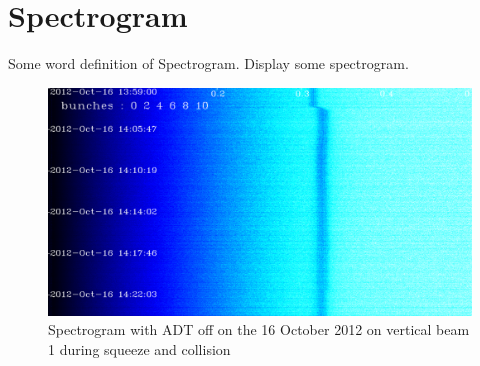 \section{Spectrogram}
\label{sec:spectrogram}

Some word definition of Spectrogram. Display some spectrogram.

\begin{figure}[H]
	\caption{Spectrogram with ADT off on the 16 October 2012 on vertical beam 1 during squeeze and collision}
	\centering
	\includegraphics[scale=0.3]{md-121016-vb1-m1-6bunches-10acc-1359-1425-collision.pdf}
\end{figure}